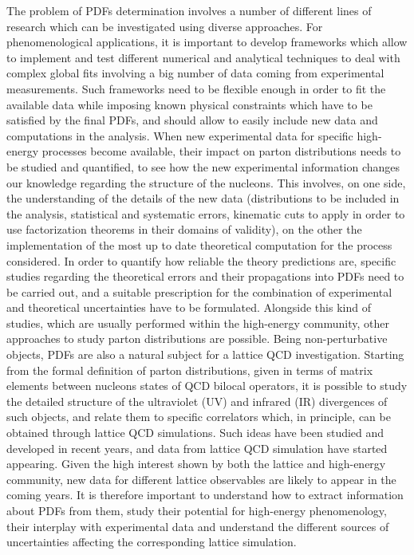 The problem of PDFs determination involves a number of different lines of research which can be investigated 
using diverse approaches.
%
For phenomenological applications, it is important to develop frameworks which allow to implement and test
different numerical and analytical techniques to deal with complex global fits involving a big number of data coming
from experimental measurements. Such frameworks need to be flexible enough in order to fit the available data 
while imposing known physical constraints which have to be satisfied by the final PDFs,
and should allow to easily include new data and computations in the analysis. 
%
When new experimental data for specific high-energy processes become available,
their impact on parton distributions needs to be studied and quantified, to see how the new experimental 
information changes our knowledge regarding the structure of the nucleons.
This involves, on one side, the understanding of the details of the new data (distributions to be included in the analysis,
statistical and systematic errors, kinematic cuts to apply in order to use factorization theorems in their domains of validity), 
on the other the implementation of the most up to date theoretical computation for the process considered.  
%
In order to quantify how reliable the theory predictions are, specific studies regarding the theoretical errors
and their propagations into PDFs need to be carried out, and a suitable prescription for the combination
of experimental and theoretical uncertainties have to be formulated.
%
Alongside this kind of studies, which are usually performed within the high-energy community,
other approaches to study parton distributions are possible.
Being non-perturbative objects, PDFs are also a natural subject for a lattice QCD investigation. 
Starting from the formal definition of parton distributions, given in terms of matrix elements between 
nucleons states of QCD bilocal operators, it is possible to study the detailed structure of the ultraviolet (UV)
and infrared (IR) divergences of such objects, and relate them to specific correlators which, in principle, 
can be obtained through lattice QCD simulations. Such ideas have been studied and developed in recent years,
and data from lattice QCD simulation have started appearing. 
Given the high interest shown by both the lattice and high-energy community, new data for different lattice observables
are likely to appear in the coming years. 
It is therefore important to understand how to extract information about PDFs from them, 
study their potential for high-energy phenomenology,
their interplay with experimental data and understand the different sources of uncertainties 
affecting the corresponding lattice simulation.

